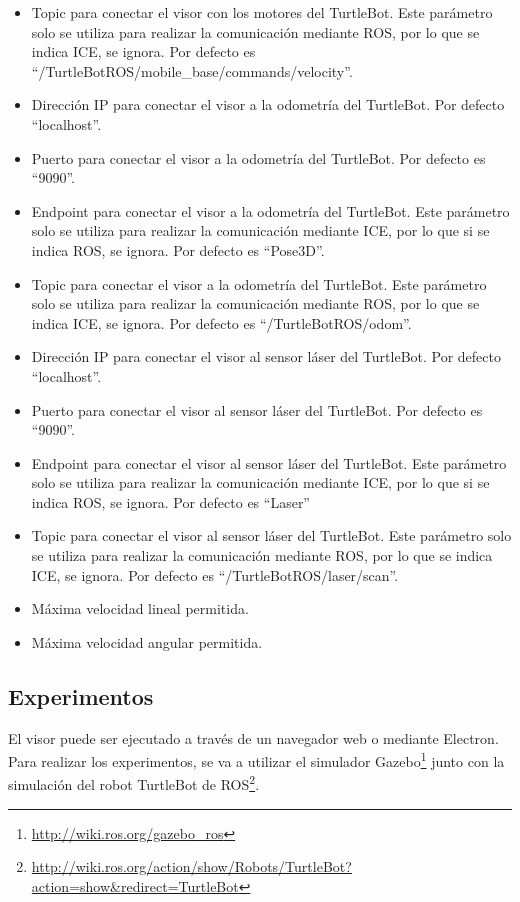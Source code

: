 \begin{itemize}
\item Topic para conectar el visor con los motores del TurtleBot. Este parámetro solo se utiliza para realizar la comunicación mediante ROS, por lo que se indica ICE, se ignora. Por defecto es ``/TurtleBotROS/mobile\_base/commands/velocity''.
\item Dirección IP para conectar el visor a la odometría del TurtleBot. Por defecto ``localhost''.
\item Puerto para conectar el visor a la odometría del TurtleBot. Por defecto es ``9090''.
\item Endpoint para conectar el visor a la odometría del TurtleBot. Este parámetro solo se utiliza para realizar la comunicación mediante ICE, por lo que si se indica ROS, se ignora. Por defecto es ``Pose3D''.
\item Topic para conectar el visor a la odometría del TurtleBot. Este parámetro solo se utiliza para realizar la comunicación mediante ROS, por lo que se indica ICE, se ignora. Por defecto es ``/TurtleBotROS/odom''.
\item Dirección IP para conectar el visor al sensor láser del TurtleBot. Por defecto ``localhost''.
\item Puerto para conectar el visor al sensor láser del TurtleBot. Por defecto es ``9090''.
\item Endpoint para conectar el visor al sensor láser del TurtleBot. Este parámetro solo se utiliza para realizar la comunicación mediante ICE, por lo que si se indica ROS, se ignora. Por defecto es ``Laser''
\item Topic para conectar el visor al sensor láser del TurtleBot. Este parámetro solo se utiliza para realizar la comunicación mediante ROS, por lo que se indica ICE, se ignora. Por defecto es ``/TurtleBotROS/laser/scan''.
\item Máxima velocidad lineal permitida.
\item Máxima velocidad angular permitida.
\end{itemize}

\subsection{Experimentos}
El visor puede ser ejecutado a través de un navegador web o mediante Electron. Para realizar los experimentos, se va a utilizar el simulador Gazebo\footnote{\url{http://wiki.ros.org/gazebo_ros}} junto con la simulación del robot TurtleBot de ROS\footnote{\url{http://wiki.ros.org/action/show/Robots/TurtleBot?action=show&redirect=TurtleBot}}.

